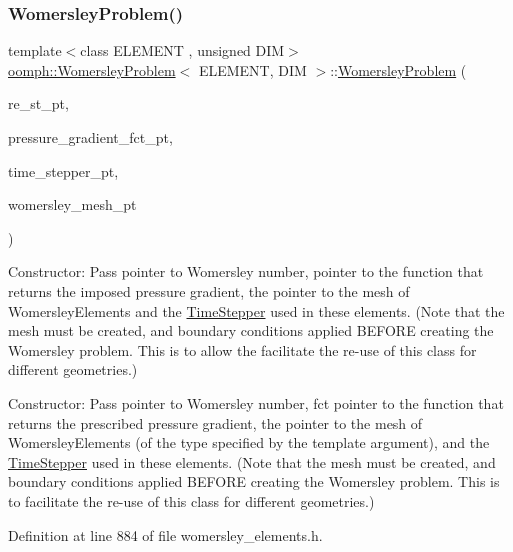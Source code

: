 \subsubsection{\texorpdfstring{Womersley\+Problem()}{WomersleyProblem()}\hspace{0.1cm}{\footnotesize\ttfamily [2/2]}}
{\footnotesize\ttfamily template$<$class E\+L\+E\+M\+E\+NT , unsigned D\+IM$>$ \\
\hyperlink{classoomph_1_1WomersleyProblem}{oomph\+::\+Womersley\+Problem}$<$ E\+L\+E\+M\+E\+NT, D\+IM $>$\+::\hyperlink{classoomph_1_1WomersleyProblem}{Womersley\+Problem} (\begin{DoxyParamCaption}\item[{double $\ast$}]{re\+\_\+st\+\_\+pt,  }\item[{\hyperlink{classoomph_1_1WomersleyProblem_ac3607d12a92dede9ed2e93ae64f300b3}{Prescribed\+Pressure\+Gradient\+Fct\+Pt}}]{pressure\+\_\+gradient\+\_\+fct\+\_\+pt,  }\item[{\hyperlink{classoomph_1_1TimeStepper}{Time\+Stepper} $\ast$}]{time\+\_\+stepper\+\_\+pt,  }\item[{\hyperlink{classoomph_1_1Mesh}{Mesh} $\ast$}]{womersley\+\_\+mesh\+\_\+pt }\end{DoxyParamCaption})}



Constructor\+: Pass pointer to Womersley number, pointer to the function that returns the imposed pressure gradient, the pointer to the mesh of Womersley\+Elements and the \hyperlink{classoomph_1_1TimeStepper}{Time\+Stepper} used in these elements. (Note that the mesh must be created, and boundary conditions applied B\+E\+F\+O\+RE creating the Womersley problem. This is to allow the facilitate the re-\/use of this class for different geometries.) 

Constructor\+: Pass pointer to Womersley number, fct pointer to the function that returns the prescribed pressure gradient, the pointer to the mesh of Womersley\+Elements (of the type specified by the template argument), and the \hyperlink{classoomph_1_1TimeStepper}{Time\+Stepper} used in these elements. (Note that the mesh must be created, and boundary conditions applied B\+E\+F\+O\+RE creating the Womersley problem. This is to facilitate the re-\/use of this class for different geometries.) 

Definition at line 884 of file womersley\+\_\+elements.\+h.

\mbox{\label{classoomph_1_1WomersleyProblem_a9a8cc169abe4814d9f9851f4eb936701}} 
